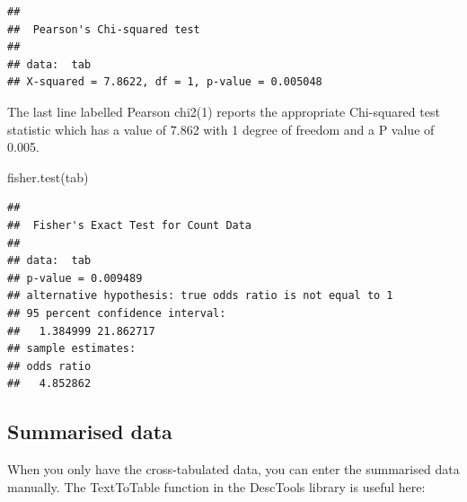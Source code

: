 \documentclass[
]{memoir}
\newenvironment{Shaded}{\begin{snugshade}}{\end{snugshade}}
\newcommand{\AttributeTok}[1]{\textcolor[rgb]{0.77,0.63,0.00}{#1}}
\newcommand{\ConstantTok}[1]{\textcolor[rgb]{0.00,0.00,0.00}{#1}}
\newcommand{\FunctionTok}[1]{\textcolor[rgb]{0.00,0.00,0.00}{#1}}
\newcommand{\NormalTok}[1]{#1}
\newcommand{\OtherTok}[1]{\textcolor[rgb]{0.56,0.35,0.01}{#1}}
\newcommand{\SpecialCharTok}[1]{\textcolor[rgb]{0.00,0.00,0.00}{#1}}
\newcommand{\StringTok}[1]{\textcolor[rgb]{0.31,0.60,0.02}{#1}}
\begin{document}
\begin{verbatim}
## 
##  Pearson's Chi-squared test
## 
## data:  tab
## X-squared = 7.8622, df = 1, p-value = 0.005048
\end{verbatim}

The last line labelled Pearson chi2(1) reports the appropriate Chi-squared test statistic which has a value of 7.862 with 1 degree of freedom and a P value of 0.005.

\begin{Shaded}
\begin{Highlighting}[]
\FunctionTok{fisher.test}\NormalTok{(tab)}
\end{Highlighting}
\end{Shaded}

\begin{verbatim}
## 
##  Fisher's Exact Test for Count Data
## 
## data:  tab
## p-value = 0.009489
## alternative hypothesis: true odds ratio is not equal to 1
## 95 percent confidence interval:
##   1.384999 21.862717
## sample estimates:
## odds ratio 
##   4.852862
\end{verbatim}

\hypertarget{summarised-data-1}{%
\subsection{Summarised data}\label{summarised-data-1}}

When you only have the cross-tabulated data, you can enter the summarised data manually. The TextToTable function in the DescTools library is useful here:

\begin{Shaded}
\end{Shaded}
\end{document}
